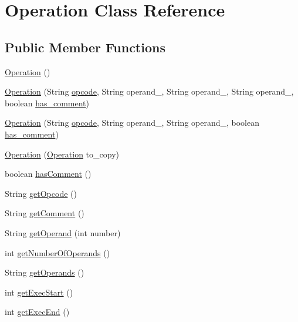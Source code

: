 \hypertarget{classOperation}{\section{\-Operation \-Class \-Reference}
\label{classOperation}
}
\subsection*{\-Public \-Member \-Functions}
\begin{DoxyCompactItemize}
\item 
\hyperlink{classOperation_a91e0f1079df0a9ce564816aa610a5335}{\-Operation} ()
\item 
\hyperlink{classOperation_a2e21fd9203d0f82233a25c0930a64fff}{\-Operation} (\-String \hyperlink{classOperation_a91a69611ab1dd4ca12de1abdd49c2b42}{opcode}, \-String operand\-\_, \-String operand\-\_, \-String operand\-\_, boolean \hyperlink{classOperation_ac3f08d5e96c77223a1fbfa68afb0d63a}{has\-\_\-comment})
\item 
\hyperlink{classOperation_a5b9b14110e36a150abba066a98c96e81}{\-Operation} (\-String \hyperlink{classOperation_a91a69611ab1dd4ca12de1abdd49c2b42}{opcode}, \-String operand\-\_, \-String operand\-\_, boolean \hyperlink{classOperation_ac3f08d5e96c77223a1fbfa68afb0d63a}{has\-\_\-comment})
\item 
\hyperlink{classOperation_ad4446a177e8fee8190c847711dd040e3}{\-Operation} (\hyperlink{classOperation}{\-Operation} to\-\_\-copy)
\item 
boolean \hyperlink{classOperation_aa2db062dbc961ac619c3fdf87409b2f1}{has\-Comment} ()
\item 
\-String \hyperlink{classOperation_a1fee9b845f368eaa45f8c3a59fdc6768}{get\-Opcode} ()
\item 
\-String \hyperlink{classOperation_aa1f781d95004579b19a32edd7cf13b53}{get\-Comment} ()
\item 
\-String \hyperlink{classOperation_a532c5b1c649dfa9864279f545f5e0b8d}{get\-Operand} (int number)
\item 
int \hyperlink{classOperation_a96f020f9945950f2f753f7d1a0aa988b}{get\-Number\-Of\-Operands} ()
\item 
\-String \hyperlink{classOperation_a1e310aee2b5aeefa8094d2197816af9b}{get\-Operands} ()
\item 
int \hyperlink{classOperation_a840cc134fbf5b2374b2b427a754fb4bf}{get\-Exec\-Start} ()
\item 
int \hyperlink{classOperation_a75c1ec9890127365d2b646d0a725a3bd}{get\-Exec\-End} ()

\end{DoxyCompactItemize}
